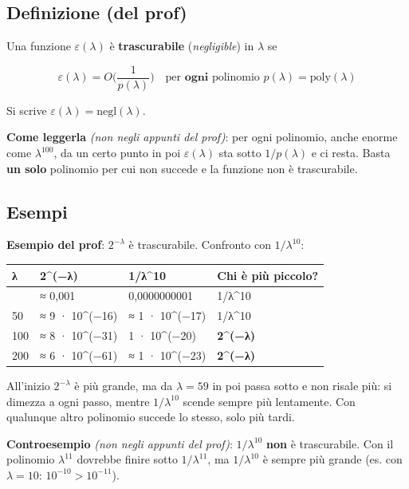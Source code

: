 \subsection{Definizione (del prof)}

Una funzione \(\varepsilon(\lambda)\) è \textbf{trascurabile} (\emph{negligible}) in \(\lambda\) se

\[
\varepsilon(\lambda) = O\Big(\frac{1}{p(\lambda)}\Big) \quad \text{per } \textbf{ogni} \text{ polinomio } p(\lambda) = \text{poly}(\lambda)
\]

Si scrive \(\varepsilon(\lambda) = \text{negl}(\lambda)\).

\textbf{Come leggerla} \emph{(non negli appunti del prof)}: per ogni polinomio, anche enorme come \(\lambda^{100}\), da un certo punto in poi \(\varepsilon(\lambda)\) sta sotto \(1/p(\lambda)\) e ci resta. Basta \textbf{un solo} polinomio per cui non succede e la funzione non è trascurabile.

\subsection{Esempi}

\textbf{Esempio del prof}: \(2^{-\lambda}\) è trascurabile. Confronto con \(1/\lambda^{10}\):

\begin{longtable}[]{@{}llll@{}}
\toprule\noalign{}
λ & 2\^{}(−λ) & 1/λ\^{}10 & Chi è più piccolo? \\
\midrule\noalign{}
\endhead
\bottomrule\noalign{}
\endlastfoot
10 & ≈ 0,001 & 0,0000000001 & 1/λ\^{}10 \\
50 & ≈ 9 · 10\^{}(−16) & ≈ 1 · 10\^{}(−17) & 1/λ\^{}10 \\
100 & ≈ 8 · 10\^{}(−31) & 1 · 10\^{}(−20) & \textbf{2\^{}(−λ)} \\
200 & ≈ 6 · 10\^{}(−61) & ≈ 1 · 10\^{}(−23) & \textbf{2\^{}(−λ)} \\
\end{longtable}

All'inizio \(2^{-\lambda}\) è più grande, ma da \(\lambda = 59\) in poi passa sotto e non risale più: si dimezza a ogni passo, mentre \(1/\lambda^{10}\) scende sempre più lentamente. Con qualunque altro polinomio succede lo stesso, solo più tardi.

\textbf{Controesempio} \emph{(non negli appunti del prof)}: \(1/\lambda^{10}\) \textbf{non} è trascurabile. Con il polinomio \(\lambda^{11}\) dovrebbe finire sotto \(1/\lambda^{11}\), ma \(1/\lambda^{10}\) è sempre più grande (es. con \(\lambda = 10\): \(10^{-10} > 10^{-11}\)).

